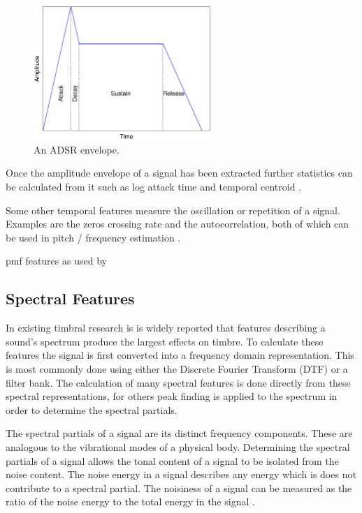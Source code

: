 		\begin{figure}[h!]
			\centering
			\includegraphics[width=0.6\textwidth]{chapter2/Images/ADSR.eps}
			\caption{An ADSR envelope.}
			\label{fig:ADSR}
		\end{figure}

		Once the amplitude envelope of a signal has been extracted further statistics can be calculated from it such
		as log attack time and temporal centroid \citep{peeters2000instrument}.

		Some other temporal features measure the oscillation or repetition of a signal. Examples are the zeros
		crossing rate and the autocorrelation, both of which can be used in pitch / frequency estimation
		\citep{mcleod2005a}.

		\note
		{
			pmf features as used by \citet{wilson2014profiling}
		}

	\subsection{Spectral Features}
	\label{sec:Timbre-LowLevelFeatures-Spectral}
		In existing timbral research is is widely reported that features describing a sound's spectrum produce the
		largest effects on timbre. To calculate these features the signal is first converted into a frequency
		domain representation. This is most commonly done using either the Discrete Fourier Transform (DTF) or a
		filter bank. The calculation of many spectral features is done directly from these spectral representations,
		for others peak finding is applied to the spectrum in order to determine the spectral partials.

		The spectral partials of a signal are its distinct frequency components. These are analogous to the
		vibrational modes of a physical body. Determining the spectral partials of a signal allows the tonal content
		of a signal to be isolated from the noise content. The noise energy in a signal describes any energy which
		is does not contribute to a spectral partial. The noisiness of a signal can be measured as the ratio of the
		noise energy to the total energy in the signal \citep{serra1998sound}.

